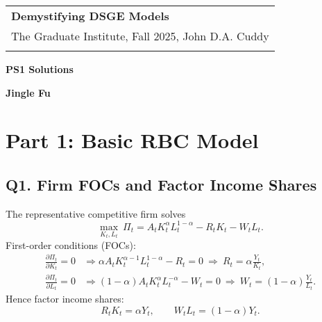 \documentclass[a4paper,12pt]{article} %
\theoremstyle{nonitalic}
\newenvironment{solution}[1]
  {\renewcommand\theinnercustomsol{#1}\innercustomsol}
  {\endinnercustomsol}
\newcounter{solutionctr}
\renewcommand{\thesolutionctr}{(\alph{solutionctr})}
\newenvironment{autosolution}
  {\stepcounter{solutionctr}\begin{solution}{\thesolutionctr}}
  {\end{solution}}
\begin{document}
\thispagestyle{empty} %

\begin{tabular}{p{15.5cm}} %
{\large \bf Demystifying DSGE Models} \\
The Graduate Institute, Fall 2025, John D.A. Cuddy\\
\hline %
\\
\end{tabular} %

\vspace*{0.3cm} %

\begin{center} %
	{\Large \bf PS1 Solutions} %
	\vspace{2mm}
	
	{\bf Jingle Fu} %
		
\end{center}  

\vspace{0.4cm}



\section*{Part 1: Basic RBC Model}

\subsection*{Q1. Firm FOCs and Factor Income Shares}
The representative competitive firm solves
\begin{equation}
\max_{K_t,L_t}\ \Pi_t = A_t K_t^{\alpha} L_t^{1-\alpha} - R_t K_t - W_t L_t.
\end{equation}
First-order conditions (FOCs):
\begin{align}
\frac{\partial \Pi_t}{\partial K_t}=0 
&\Rightarrow \alpha A_t K_t^{\alpha-1} L_t^{1-\alpha} - R_t = 0 
\ \Rightarrow\ R_t=\alpha \frac{Y_t}{K_t},\\[4pt]
\frac{\partial \Pi_t}{\partial L_t}=0 
&\Rightarrow (1-\alpha) A_t K_t^{\alpha} L_t^{-\alpha} - W_t = 0 
\ \Rightarrow\ W_t=(1-\alpha)\frac{Y_t}{L_t}.
\end{align}
Hence factor income shares:
\begin{equation}
R_t K_t=\alpha Y_t, \qquad W_t L_t=(1-\alpha)Y_t.
\end{equation}
\end{document}
